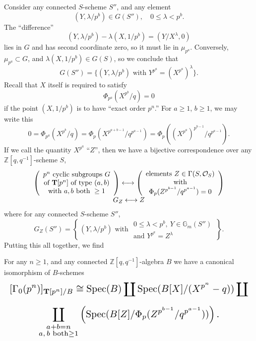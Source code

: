 Consider any connected $S$-scheme $S''$, and any element
\[
(Y, \lambda/p^b) \in G(S''), \quad 0 \le \lambda < p^b .
\]
The ``difference''
\[
(Y, \lambda/p^b) - \lambda(X, 1/p^b) = (Y/X^\lambda, 0)
\]
lies in $G$ and has second coordinate zero, so it must lie in $\mu_{p^a}$. Conversely, $\mu_{p^a} \subset G$, and $\lambda(X, 1/p^b) \in G(S)$, so we conclude that
\[
G(S'') = \{(Y, \lambda/p^b) \text{ with } Y^{p^a} = (X^{p^a})^\lambda\} .
\]
Recall that $X$ itself is required to satisfy
\[
\Phi_{p^a}(X^{p^b}/q) = 0
\]
if the point $(X, 1/p^b)$ is to have ``exact order $p^n$.'' For $a \ge 1$, $b \ge 1$, we may write this
\[
0 = \Phi_{p^a}(X^{p^b}/q) = \Phi_p(X^{p^{a+b-1}}/q^{p^{a-1}}) = \Phi_p((X^{p^a})^{p^{b-1}}/q^{p^{a-1}}) .
\]
If we call the quantity $X^{p^a}$ ``$Z$'', then we have a bijective correspondence over any $\mathbb{Z}[q,q^{-1}]$-scheme $S$,
\[
\begin{array}{c}
\left(
\begin{array}{c}
p^n \text{ cyclic subgroups } G \\
\text{of } \mathbf{T}[p^n] \text{ of type } (a,b) \\
\text{with } a, b \text{ both } \ge 1
\end{array}\right)
\longleftrightarrow
\left(
\begin{array}{c}
\text{elements } Z \in \Gamma(S, \mathcal{O}_S) \\
\text{with} \\
\Phi_p(Z^{p^{b-1}}/q^{p^{a-1}}) = 0
\end{array}\right) \\[6pt]
G_Z \longleftrightarrow Z
\end{array}
\]
where for any connected $S$-scheme $S''$,
\[
G_Z(S'') = \left\{\, (Y, \lambda/p^b) \text{ with } \substack{0 \le \lambda < p^b, \ Y \in \mathbb{G}_m(S'') \\ \text{and } Y^{p^a} = Z^\lambda} \,\right\} .
\]
Putting this all together, we find

\begin{kthm}\label{thm:13.6.6}
For any $n \ge 1$, and any connected $\mathbb{Z}[q,q^{-1}]$-algebra $B$ we have a canonical isomorphism of $B$-schemes
\[
\resizebox{\linewidth}{!}{$\displaystyle
\begin{gathered}
[\Gamma_0(p^n)]_{\mathbf{T}[p^n]/B} \cong \Spec(B) \coprod \Spec(B[X]/(X^{p^n} - q)) \coprod \\[5pt]
\coprod_{\substack{a+b=n \\ a,\, b\text{ both} \ge 1}} \left(\Spec(B[Z]/\Phi_p(Z^{p^{b-1}}/q^{p^{a-1}}))\right) .
\end{gathered}$}
\]
\end{kthm}

